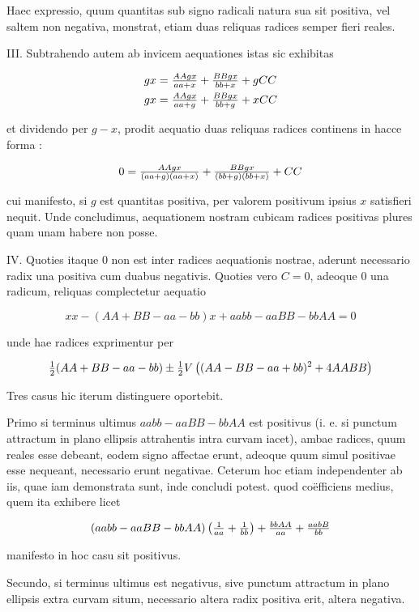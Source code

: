 \documentclass[twoside,12pt, showframe]{memoir}
\let\oldfrac\frac
\def\frac#1#2{\mathchoice{\tfrac{#1}{#2}}{\oldfrac{#1}{#2}}{\genfrac{}{}{}{2}{#1}{#2\mathstrut}}{\genfrac{}{}{}{3}{#1}{#2\mathstrut}}}
\begin{document}
Haec expressio, quum quantitas sub signo radicali natura sua sit positiva, vel saltem non negativa, monstrat, etiam duas reliquas radices semper fieri reales.

III. Subtrahendo autem ab invicem aequationes istas sic exhibitas

\[
\begin{aligned}
& g x=\frac{A A g x}{a a+x}+\frac{B B g x}{b b+x}+g C C \\
& g x=\frac{A A g x}{a a+g}+\frac{B B g x}{b b+g}+x C C
\end{aligned}
\]

et dividendo per \(g-x\), prodit aequatio duas reliquas radices continens in hacce forma :

\[
0=\frac{A A g x}{(a a+g)(a a+x)}+\frac{B B g x}{(b b+g)(b b+x)}+C C
\]

cui manifesto, si \(g\) est quantitas positiva, per valorem positivum ipsius \(x\) satisfieri nequit. Unde concludimus, aequationem nostram cubicam radices positivas plures quam unam habere non posse.

IV. Quoties itaque 0 non est inter radices aequationis nostrae, aderunt necessario radix una positiva cum duabus negativis. Quoties vero \(C=0\), adeoque 0 una radicum, reliquas complectetur aequatio

\[
x x-(A A+B B-a a-b b) x+a a b b-a a B B-b b A A=0
\]

unde hae radices exprimentur per

\[
\frac{1}{2}(A A+B B-a a-b b) \pm \frac{1}{2} V\left((A A-B B-a a+b b)^{2}+4 A A B B\right)
\]

Tres casus hic iterum distinguere oportebit.

Primo si terminus ultimus \(a a b b-a a B B-b b A A\) est positivus (i. e. si punctum attractum in plano ellipsis attrahentis intra curvam iacet), ambae radices, quum reales esse debeant, eodem signo affectae erunt, adeoque quum simul positivae esse nequeant, necessario erunt negativae. Ceterum hoc etiam independenter ab iis, quae iam demonstrata sunt, inde concludi potest. quod coëfficiens medius, quem ita exhibere licet

\[
(a a b b-a a B B-b b A A)\left(\frac{1}{a a}+\frac{1}{b b}\right)+\frac{b b A A}{a a}+\frac{a a b B}{b b}
\]

manifesto in hoc casu sit positivus.

Secundo, si terminus ultimus est negativus, sive punctum attractum in plano ellipsis extra curvam situm, necessario altera radix positiva erit, altera negativa.
\end{document}
